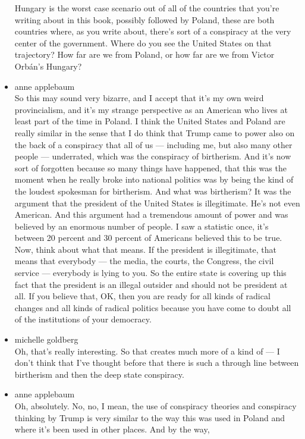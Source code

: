 \begin{itemize}
  Hungary is the worst case scenario out of all of the countries that
  you're writing about in this book, possibly followed by Poland, these
  are both countries where, as you write about, there's sort of a
  conspiracy at the very center of the government. Where do you see the
  United States on that trajectory? How far are we from Poland, or how
  far are we from Victor Orbán's Hungary?
\item
  anne applebaum\\
  So this may sound very bizarre, and I accept that it's my own weird
  provincialism, and it's my strange perspective as an American who
  lives at least part of the time in Poland. I think the United States
  and Poland are really similar in the sense that I do think that Trump
  came to power also on the back of a conspiracy that all of us ---
  including me, but also many other people --- underrated, which was the
  conspiracy of birtherism. And it's now sort of forgotten because so
  many things have happened, that this was the moment when he really
  broke into national politics was by being the kind of the loudest
  spokesman for birtherism. And what was birtherism? It was the argument
  that the president of the United States is illegitimate. He's not even
  American. And this argument had a tremendous amount of power and was
  believed by an enormous number of people. I saw a statistic once, it's
  between 20 percent and 30 percent of Americans believed this to be
  true. Now, think about what that means. If the president is
  illegitimate, that means that everybody --- the media, the courts, the
  Congress, the civil service --- everybody is lying to you. So the
  entire state is covering up this fact that the president is an illegal
  outsider and should not be president at all. If you believe that, OK,
  then you are ready for all kinds of radical changes and all kinds of
  radical politics because you have come to doubt all of the
  institutions of your democracy.
\item
  michelle goldberg\\
  Oh, that's really interesting. So that creates much more of a kind of
  --- I don't think that I've thought before that there is such a
  through line between birtherism and then the deep state conspiracy.
\item
  anne applebaum\\
  Oh, absolutely. No, no, I mean, the use of conspiracy theories and
  conspiracy thinking by Trump is very similar to the way this was used
  in Poland and where it's been used in other places. And by the way,

\end{itemize}
